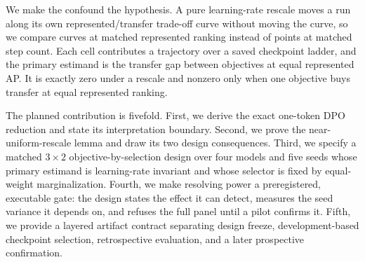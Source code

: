 We make the confound the hypothesis. A pure learning-rate rescale moves a run
along its own represented/transfer trade-off curve without moving the curve, so we
compare curves at matched represented ranking instead of points at matched step
count. Each cell contributes a trajectory over a saved checkpoint ladder, and the
primary estimand is the transfer gap between objectives at equal represented AP.
It is exactly zero under a rescale and nonzero only when one objective buys
transfer at equal represented ranking.

The planned contribution is fivefold. First, we derive the exact one-token DPO
reduction and state its interpretation boundary. Second, we prove the
near-uniform-rescale lemma and draw its two design consequences. Third, we specify
a matched $3\times2$ objective-by-selection design over four models and five seeds
whose primary estimand is learning-rate invariant and whose selector is fixed by
equal-weight marginalization. Fourth, we make resolving power a preregistered,
executable gate: the design states the effect it can detect, measures the seed
variance it depends on, and refuses the full panel until a pilot confirms it.
Fifth, we provide a layered artifact contract separating design freeze,
development-based checkpoint selection, retrospective evaluation, and a later
prospective confirmation.

